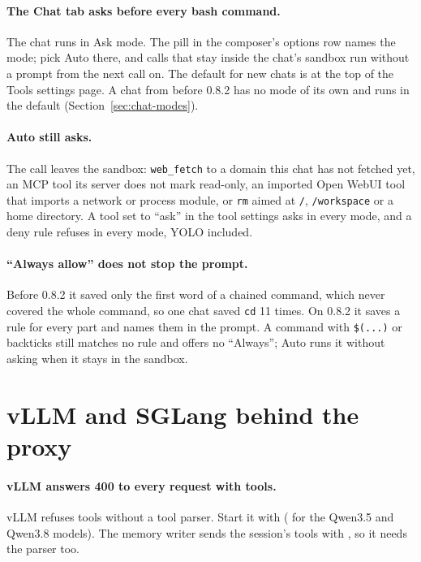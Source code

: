 \paragraph{The Chat tab asks before every bash command.} The chat runs in Ask mode. The pill in the composer's options row names the mode; pick Auto there, and calls that stay inside the chat's sandbox run without a prompt from the next call on. The default for new chats is at the top of the Tools settings page. A chat from before 0.8.2 has no mode of its own and runs in the default (Section~\ref{sec:chat-modes}).

\paragraph{Auto still asks.} The call leaves the sandbox: \texttt{web\_fetch} to a domain this chat has not fetched yet, an MCP tool its server does not mark read-only, an imported Open WebUI tool that imports a network or process module, or \texttt{rm} aimed at \texttt{/}, \texttt{/workspace} or a home directory. A tool set to \enquote{ask} in the tool settings asks in every mode, and a deny rule refuses in every mode, YOLO included.

\paragraph{\enquote{Always allow} does not stop the prompt.} Before 0.8.2 it saved only the first word of a chained command, which never covered the whole command, so one chat saved \texttt{cd} 11 times. On 0.8.2 it saves a rule for every part and names them in the prompt. A command with \texttt{\$(...)} or backticks still matches no rule and offers no \enquote{Always}; Auto runs it without asking when it stays in the sandbox.

\section{vLLM and SGLang behind the proxy}

\paragraph{vLLM answers 400 to every request with tools.} vLLM refuses tools without a tool parser. Start it with  ( for the Qwen3.5 and Qwen3.8 models). The memory writer sends the session's tools with , so it needs the parser too.

